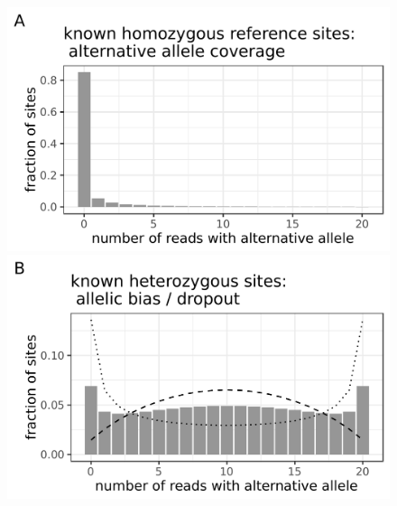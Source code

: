 \documentclass[fleqn,12pt,inline]{wlscirep}
\begin{document}
\begin{figure}[!tpb]%
  \begin{minipage}[t]{.99\linewidth}
    \begin{minipage}{.47\linewidth}
      \includegraphics[width=.95\linewidth]{figs/Lodato_hom-ref-model_cov-20.pdf}
    \end{minipage}
    \hspace{2ex}
    \begin{minipage}{.47\linewidth}
      \includegraphics[width=.95\linewidth]{figs/Lodato_het-model_cov-20.pdf}
    \end{minipage}
  \end{minipage}
  \vspace{2ex}
  \hspace{1ex}
  \begin{minipage}[t]{.99\linewidth}
    \begin{minipage}{.47\linewidth}

\end{minipage}
\end{minipage}
\end{figure}
\end{document}
